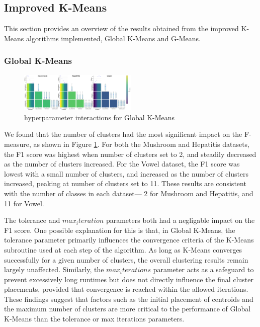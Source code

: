 \subsection{Improved K-Means}
\label{subsec:improvedkmeansresults}

This section provides an overview of the results obtained from the improved K-Means algorithms implemented, Global K-Means and G-Means.

\subsubsection{Global K-Means}
\label{subsec:globalkmeansresults}

\begin{figure}[h!]
    \centering
    \includegraphics[width=0.5\textwidth]{figures/interactions_global_kmeans.png}
    \caption{hyperparameter interactions for Global K-Means}
    \label{fig:interactions-global-kmeans}
\end{figure}

We found that the number of clusters had the most significant impact on the F-measure, as shown in Figure \ref{fig:interactions-global-kmeans}. For both the Mushroom and Hepatitis datasets, the F1 score was
highest when number of clusters set to 2, and steadily decreased as the number of clusters increased. For the Vowel dataset, the F1 score was lowest 
with a small number of clusters, and increased as the number of clusters increased, peaking at number of clusters set to 11.
These results are consistent with the number of classes in each dataset— 2 for Mushroom and Hepatitis, and 11 for Vowel.

The tolerance and $max_iteration$ parameters both had a negligable impact on the F1 score.
One possible explanation for this is that, in Global K-Means, the tolerance parameter primarily
influences the convergence criteria of the K-Means subroutine used at each step of the algorithm.
As long as K-Means converges successfully for a given number of clusters, the overall clustering
results remain largely unaffected. Similarly, the $max_iterations$ parameter acts as a safeguard to prevent
excessively long runtimes but does not directly influence the final cluster placements, provided that
convergence is reached within the allowed iterations. These findings suggest that factors such as
the initial placement of centroids and the maximum number of clusters are more critical to the
performance of Global K-Means than the tolerance or max iterations parameters.

